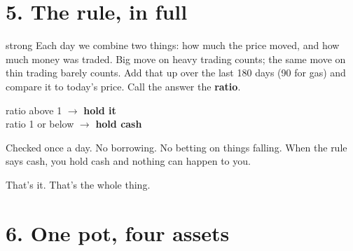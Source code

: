 \documentclass[12pt,a4paper]{article}
\begin{document}
\newpage
\section{5. The rule, in full}

\begin{kbox}{strong}
Each day we combine two things: how much the price moved, and how much
money was traded. Big move on heavy trading counts; the same move on
thin trading barely counts. Add that up over the last 180 days
(90 for gas) and compare it to today's price. Call the answer the
\textbf{ratio}.

\vspace{0.6em}
\begin{center}
\Large
ratio above 1 \;$\longrightarrow$\; \textbf{hold it}\\[0.4em]
ratio 1 or below \;$\longrightarrow$\; \textbf{hold cash}
\end{center}

\vspace{0.5em}
Checked once a day. No borrowing. No betting on things falling. When
the rule says cash, you hold cash and nothing can happen to you.

\vspace{0.4em}
That's it. That's the whole thing.
\end{kbox}

\section{6. One pot, four assets}
\end{document}
